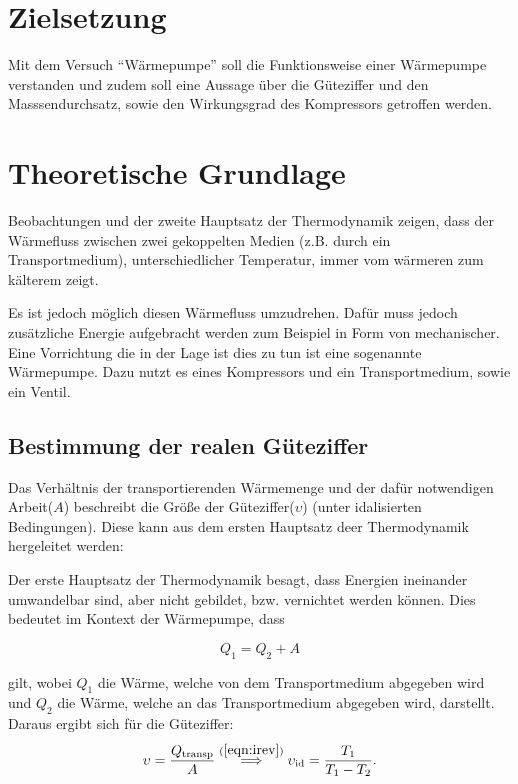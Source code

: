 


    \tableofcontents
    
    \newpage
    \section{Zielsetzung}
    Mit dem Versuch "`Wärmepumpe"' soll die Funktionsweise einer Wärmepumpe verstanden und zudem soll eine Aussage über die Güteziffer und den Masssendurchsatz,
    sowie den Wirkungsgrad des Kompressors getroffen werden.

    \section{Theoretische Grundlage}
    Beobachtungen und der zweite Hauptsatz der Thermodynamik zeigen, dass der Wärmefluss zwischen zwei gekoppelten Medien (z.B. durch ein Transportmedium), unterschiedlicher Temperatur, immer vom wärmeren zum kälterem zeigt.

    Es ist jedoch möglich diesen Wärmefluss umzudrehen. Dafür muss jedoch zusätzliche Energie aufgebracht werden zum Beispiel in Form von mechanischer. Eine Vorrichtung die in der Lage ist dies zu tun ist 
    eine sogenannte Wärmepumpe. Dazu nutzt es eines Kompressors und ein Transportmedium, sowie ein Ventil. 

        \subsection{Bestimmung der realen Güteziffer}
    	Das Verhältnis der transportierenden Wärmemenge und der dafür notwendigen Arbeit($A$) beschreibt die Größe der Güteziffer($\upsilon$) (unter idalisierten Bedingungen).
        Diese kann aus dem ersten Hauptsatz deer Thermodynamik hergeleitet werden:

        Der erste Hauptsatz der Thermodynamik besagt, dass Energien ineinander umwandelbar sind, aber nicht gebildet, bzw. vernichtet werden können. 
        Dies bedeutet im Kontext der Wärmepumpe, dass

        \begin{equation}
            Q_1 = Q_2 + A
            \label{eqn:Th1}
        \end{equation}

        gilt, wobei $Q_1$ die Wärme, welche von dem Transportmedium abgegeben wird und $Q_2$ die Wärme, welche an das Transportmedium abgegeben wird, darstellt. Daraus ergibt sich für die Güteziffer:
        \begin{equation}
            \upsilon = \frac{Q_\text{transp}}{A} \stackrel{(\ref{eqn:irev})}{\implies} \upsilon_\text{id} = \frac{T_1}{T_1 - T_2}.
            \label{eqn:Gueteziffer}
        \end{equation}

